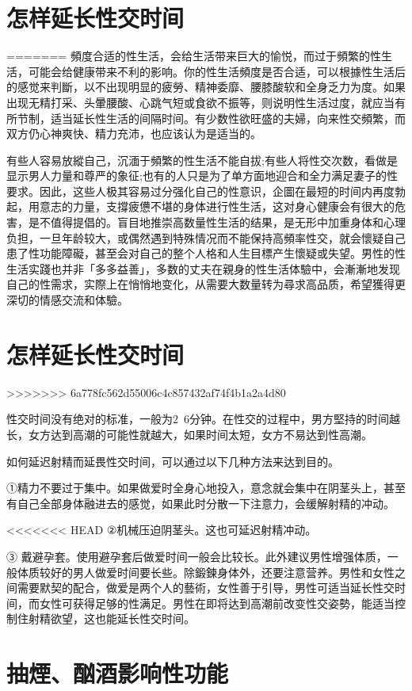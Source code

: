 \documentclass[12pt,UTF8]{ctexbook}
\begin{document}
\section{怎样延长性交时间}
=======
頻度合适的性生活，会给生活带来巨大的愉悦，而过于頻繁的性生活，可能会给健康带来不利的影响。你的性生活頻度是否合适，可以根據性生活后的感觉来判斷，以不出现明显的疲勞、精神委靡、腰膝酸软和全身乏力为度。如果出现无精打采、头暈腰酸、心跳气短或食欲不振等，则说明性生活过度，就应当有所节制，适当延长性生活的间隔时间。有少数性欲旺盛的夫婦，向来性交頻繁，而双方仍心神爽快、精力充沛，也应该认为是适当的。

有些人容易放縱自己，沉湎于頻繁的性生活不能自拔;有些人将性交次数，看做是显示男人力量和尊严的象征;也有的人只是为了单方面地迎合和全力满足妻子的性要求。因此，这些人极其容易过分强化自己的性意识，企圖在最短的时间内再度勃起，用意志的力量，支撐疲憊不堪的身体进行性生活，这对身心健康会有很大的危害，是不值得提倡的。盲目地推崇高数量性生活的结果，是无形中加重身体和心理负担，一旦年龄较大，或偶然遇到特殊情况而不能保持高頻率性交，就会懷疑自己患了性功能障礙，甚至会对自己的整个人格和人生目標产生懷疑或失望。男性的性生活实踐也并非「多多益善」，多数的丈夫在親身的性生活体驗中，会漸漸地发现自己的性需求，实際上在悄悄地变化，从需要大数量转为尋求高品质，希望獲得更深切的情感交流和体驗。

\section{怎样延长性交时间}
>>>>>>> 6a778fc562d55006c4c857432af74f4b1a2a4d80

性交时间没有绝对的标准，一般为2~6分钟。在性交的过程中，男方堅持的时间越长，女方达到高潮的可能性就越大，如果时间太短，女方不易达到性高潮。

如何延迟射精而延畏性交时间，可以通过以下几种方法来达到目的。

①精力不要过于集中。如果做爱时全身心地投入，意念就会集中在阴茎头上，甚至有自己全部身体融进去的感觉，如果此时分散一下注意力，会缓解射精的冲动。

<<<<<<< HEAD
②机械压迫阴茎头。这也可延迟射精冲动。

③ 戴避孕套。使用避孕套后做爱时间一般会比较长。此外建议男性增强体质，一般体质较好的男人做爱时间要长些。除鍛鍊身体外，还要注意营养。男性和女性之间需要默契的配合，做爱是两个人的藝術，女性善于引导，男性可适当延长性交时间，而女性可获得足够的性满足。男性在即将达到高潮前改变性交姿勢，能适当控制住射精欲望，这也能延长性交时间。

\section{抽煙、酗酒影响性功能}
\end{document}
